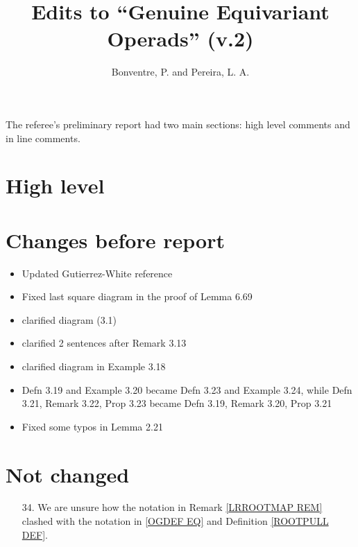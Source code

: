\documentclass{article}
\begin{document}
 
 
\title{Edits to ``Genuine Equivariant Operads'' (v.2)
\\[12pt]} %
 
\author{Bonventre, P. and Pereira, L. A.}
 
\maketitle
 
The referee's preliminary report had two main sections:
high level comments and in line comments.



\section{High level}


\section{Changes before report}

\begin{itemize}
\item Updated Gutierrez-White reference

\item Fixed last square diagram in the proof of Lemma 6.69

\item clarified diagram (3.1)

\item clarified 2 sentences after Remark 3.13

\item clarified diagram in Example 3.18

\item Defn 3.19 and Example 3.20 became Defn 3.23 and Example 3.24, while 
Defn 3.21, Remark 3.22, Prop 3.23 became Defn 3.19, Remark 3.20, Prop 3.21

\item Fixed some typos in Lemma 2.21
\end{itemize}


\section{Not changed}

\begin{itemize}

\item[34.] We are unsure how the notation in 
Remark \ref{LRROOTMAP REM} clashed with the notation in 
\eqref{OGDEF EQ} and Definition \ref{ROOTPULL DEF}.

\end{itemize}
\end{document}
